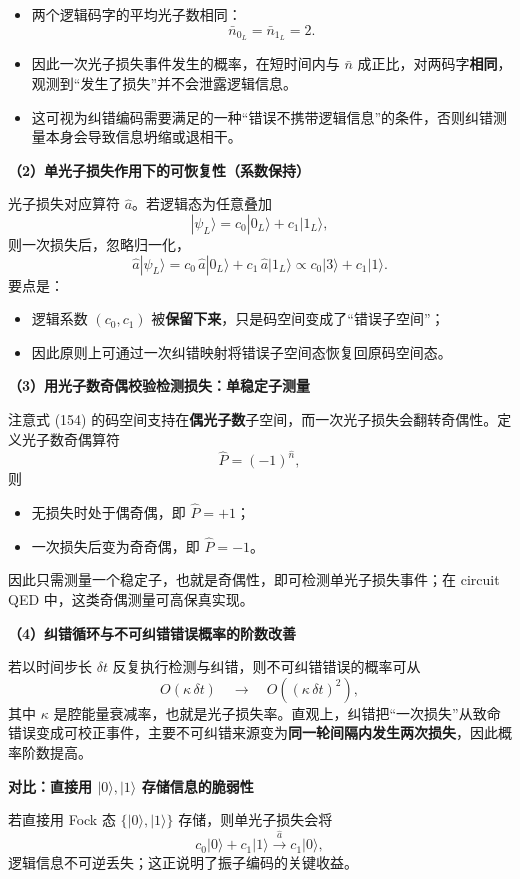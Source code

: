 \documentclass[12pt,a4paper,oneside]{ctexbook}
\begin{document}
\begin{itemize}
  \item 两个逻辑码字的平均光子数相同：
  \[
    \bar n_{0_L}=\bar n_{1_L}=2.
  \]
  \item 因此一次光子损失事件发生的概率，在短时间内与 $\bar n$ 成正比，对两码字\textbf{相同}，观测到“发生了损失”并不会泄露逻辑信息。
  \item 这可视为纠错编码需要满足的一种“错误不携带逻辑信息”的条件，否则纠错测量本身会导致信息坍缩或退相干。
\end{itemize}

\noindent\textbf{（2）单光子损失作用下的可恢复性（系数保持）}

光子损失对应算符 $\hat a$。若逻辑态为任意叠加
\[
  |\psi_L\rangle=c_0|0_L\rangle+c_1|1_L\rangle,
\]
则一次损失后，忽略归一化，
\[
  \hat a|\psi_L\rangle
  =c_0\,\hat a|0_L\rangle+c_1\,\hat a|1_L\rangle
  \propto c_0|3\rangle + c_1|1\rangle.
\]
要点是：
\begin{itemize}
  \item 逻辑系数 $(c_0,c_1)$ 被\textbf{保留下来}，只是码空间变成了“错误子空间”；
  \item 因此原则上可通过一次纠错映射将错误子空间态恢复回原码空间态。
\end{itemize}

\noindent\textbf{（3）用光子数奇偶校验检测损失：单稳定子测量}

注意式 (154) 的码空间支持在\textbf{偶光子数}子空间，而一次光子损失会翻转奇偶性。定义光子数奇偶算符
\[
  \hat P = (-1)^{\hat n},
\]
则
\begin{itemize}
  \item 无损失时处于偶奇偶，即 $\hat P=+1$；
  \item 一次损失后变为奇奇偶，即 $\hat P=-1$。
\end{itemize}
因此只需测量一个稳定子，也就是奇偶性，即可检测单光子损失事件；在 circuit QED 中，这类奇偶测量可高保真实现。

\noindent\textbf{（4）纠错循环与不可纠错错误概率的阶数改善}

若以时间步长 $\delta t$ 反复执行检测与纠错，则不可纠错错误的概率可从
\[
  O(\kappa\,\delta t)
  \quad \rightarrow \quad
  O((\kappa\,\delta t)^2),
\]
其中 $\kappa$ 是腔能量衰减率，也就是光子损失率。直观上，纠错把“一次损失”从致命错误变成可校正事件，主要不可纠错来源变为\textbf{同一轮间隔内发生两次损失}，因此概率阶数提高。

\noindent\textbf{对比：直接用 $|0\rangle,|1\rangle$ 存储信息的脆弱性}

若直接用 Fock 态 $\{|0\rangle,|1\rangle\}$ 存储，则单光子损失会将
\[
  c_0|0\rangle + c_1|1\rangle
  \xrightarrow{\hat a}
  c_1|0\rangle,
\]
逻辑信息不可逆丢失；这正说明了振子编码的关键收益。
\end{document}
